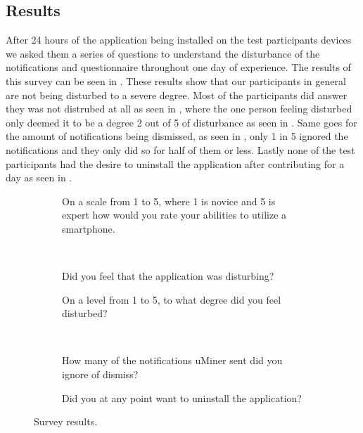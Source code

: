 \subsection{Results}
\label{sub:results}
After 24 hours of the application being installed on the test participants devices we asked them a series of questions to understand the disturbance of the notifications and questionnaire throughout one day of experience. The results of this survey can be seen in . These results show that our participants in general are not being disturbed to a severe degree. Most of the participants did answer they was not distrubed at all as seen in , where the one person feeling disturbed only deemed it to be a degree 2 out of 5 of disturbance as seen in . Same goes for the amount of notifications being dismissed, as seen in , only 1 in 5 ignored the notifications and they only did so for half of them or less. Lastly none of the test participants had the desire to uninstall the application after contributing for a day as seen in .


\begin{figure}[!htbp]
    \begin{subfigure}[!t]{.45\textwidth}
      \centering
        
        \caption{On a scale from 1 to 5, where 1 is novice and 5 is expert how would you rate your abilities to utilize a smartphone.}
      \label{fig:smartphone_ability}
    \end{subfigure}
    ~
    \begin{subfigure}[!htbp]{.45\textwidth}
      \centering
        
      \caption{Did you feel that the application was disturbing?}
      \label{fig:general_disturbance}
    \end{subfigure}
    \vspace{1em}
    \begin{subfigure}[!htbp]{.45\textwidth}
      \centering
        
      \caption{On a level from 1 to 5, to what degree did you feel disturbed?}
      \label{fig:disturbance_level}
    \end{subfigure}
    ~
    \begin{subfigure}[!htbp]{.45\textwidth}
      \centering
        
      \caption{How many of the notifications uMiner sent did you ignore of dismiss?}
      \label{fig:ingore_notifications}
    \end{subfigure}
    \vspace{1em}
    \begin{subfigure}[!htbp]{\textwidth}
      \centering
        
      \caption{Did you at any point want to uninstall the application?}
      \label{fig:want_to_uninstall}
    \end{subfigure}
    \caption{Survey results.}
    \label{fig:survey_results}
    \end{figure}
\FloatBarrier

